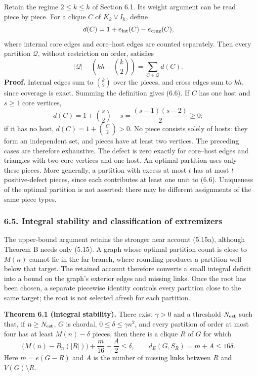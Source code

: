 \documentclass[english,11pt,a4paper]{article}
\begin{document}
Retain the regime \(2\le k\le h\) of Section 6.1. Its weight argument can be read piece by piece. For a clique \(C\) of \(K_k\vee I_h\), define \[
d(C)=1+e_{\rm int}(C)-e_{\rm cruz}(C),
\] where internal core edges and core--host edges are counted separately. Then every partition \(\mathcal Q\), without restriction on order, satisfies \[
|\mathcal Q|-\left(kh-\binom k2\right)
=\sum_{C\in\mathcal Q}d(C).
\tag{6.6}
\] \textbf{Proof.} Internal edges sum to \(\binom k2\) over the pieces, and cross edges sum to \(kh\), since coverage is exact. Summing the definition gives (6.6). If \(C\) has one host and \(s\ge1\) core vertices, \[
d(C)=1+\binom s2-s=\frac{(s-1)(s-2)}2\ge0;
\] if it has no host, \(d(C)=1+\binom{|C|}2>0\). No piece consists solely of hosts: they form an independent set, and pieces have at least two vertices. The preceding cases are therefore exhaustive. The defect is zero exactly for core--host edges and triangles with two core vertices and one host. An optimal partition uses only these pieces. More generally, a partition with excess at most \(t\) has at most \(t\) positive-defect pieces, since each contributes at least one unit to (6.6). Uniqueness of the optimal partition is not asserted: there may be different assignments of the same piece types.

\subsubsection{6.5. Integral stability and classification of extremizers}\label{integral-stability-and-classification-of-extremizers}

The upper-bound argument retains the stronger near account (5.15a), although Theorem B needs only (5.15). A graph whose optimal partition count is close to \(M(n)\) cannot lie in the far branch, where rounding produces a partition well below that target. The retained account therefore converts a small integral deficit into a bound on the graph's exterior edges and missing links. Once the root has been chosen, a separate piecewise identity controls every partition close to the same target; the root is not selected afresh for each partition.


\textbf{Theorem 6.1 (integral stability).} There exist \(\gamma>0\) and a threshold \(N_{\rm est}\) such that, if \(n\ge N_{\rm est}\), \(G\) is chordal, \(0\le\delta\le\gamma n^2\), and every partition of order at most four has at least \(M(n)-\delta\) pieces, then there is a clique \(R\) of \(G\) for which \[
\bigl(M(n)-B_n(|R|)\bigr)+\frac m{16}+\frac A2\le\delta,
\qquad
d_E(G,S_R)=m+A\le16\delta.
\tag{6.7}
\] Here \(m=e(G-R)\) and \(A\) is the number of missing links between \(R\) and \(V(G)\setminus R\).
\end{document}
